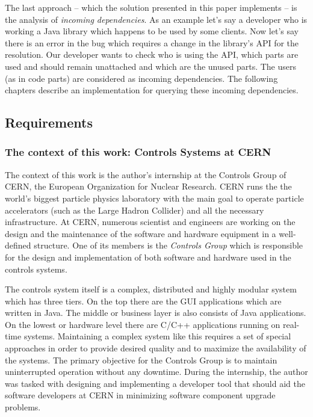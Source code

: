 The last approach -- which the solution presented in this paper implements -- is
the analysis of \emph{incoming dependencies}. As an example let's say a
developer who is working a Java library which happens to be used by some
clients. Now let's say there is an error in the bug which requires a change in
the library's API for the resolution. Our developer wants to check who is using
the API, which parts are used and should remain unattached and which are the
unused parts. The users (as in code parts) are considered as incoming
dependencies. The following chapters describe an implementation for querying these 
incoming dependencies. 
 


\subsection{Requirements}

\subsubsection{The context of this work: Controls Systems at CERN}
The context of this work is the author's internship at the Controls Group of
CERN, the European Organization for Nuclear Research. CERN runs the the world's
biggest particle physics laboratory with the main goal to operate particle
accelerators (such as the Large Hadron Collider) and all the necessary
infrastructure. At CERN, numerous scientist and engineers are working on the
design and the maintenance of the software and hardware equipment in a
well-defined structure. One of its members is the \emph{Controls Group} which is
responsible for the design and implementation of both software and hardware used
in the controls systems.

The controls system itself is a complex, distributed and highly modular system
which has three tiers. On the top there are the GUI applications which are
written in Java. The middle or business layer is also consists of Java
applications. On the lowest or hardware level there are C/C++ applications
running on real-time systems. Maintaining a complex system like this requires a
set of special approaches in order to provide desired quality and to maximize
the availability of the systems. The primary objective for the Controls Group is
to maintain uninterrupted operation without any downtime. During the internship,
the author was tasked with designing and implementing a developer tool that
should aid the software developers at CERN in minimizing software component
upgrade problems.

